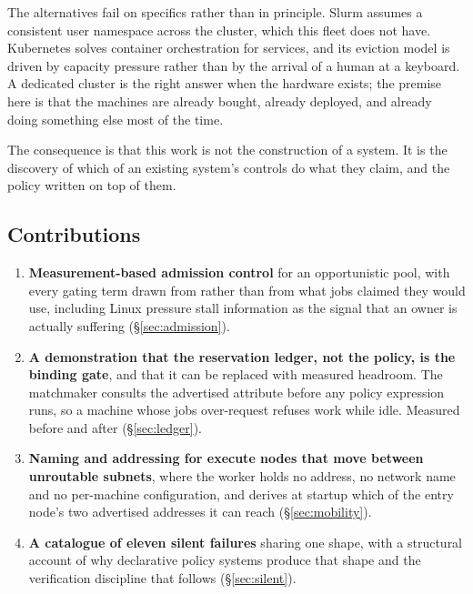 The alternatives fail on specifics rather than in principle. Slurm assumes a
consistent user namespace across the cluster, which this fleet does not have.
Kubernetes solves container orchestration for services, and its eviction model
is driven by capacity pressure rather than by the arrival of a human at a
keyboard. A dedicated cluster is the right answer when the hardware exists; the
premise here is that the machines are already bought, already deployed, and
already doing something else most of the time.

The consequence is that this work is not the construction of a system. It is the
discovery of which of an existing system's controls do what they claim, and the
policy written on top of them.

\subsection{Contributions}

\begin{enumerate}
  \item \textbf{Measurement-based admission control} for an opportunistic pool,
        with every gating term drawn from  rather than from what
        jobs claimed they would use, including Linux pressure stall information
        as the signal that an owner is actually suffering
        (\S\ref{sec:admission}).

  \item \textbf{A demonstration that the reservation ledger, not the policy, is
        the binding gate}, and that it can be replaced with measured headroom.
        The matchmaker consults the advertised  attribute before any
        policy expression runs, so a machine whose jobs over-request refuses
        work while idle. Measured before and after (\S\ref{sec:ledger}).

  \item \textbf{Naming and addressing for execute nodes that move between
        unroutable subnets}, where the worker holds no address, no network name
        and no per-machine configuration, and derives at startup which of the
        entry node's two advertised addresses it can reach
        (\S\ref{sec:mobility}).

  \item \textbf{A catalogue of eleven silent failures} sharing one shape, with a
        structural account of why declarative policy systems produce that shape
        and the verification discipline that follows (\S\ref{sec:silent}).
\end{enumerate}

